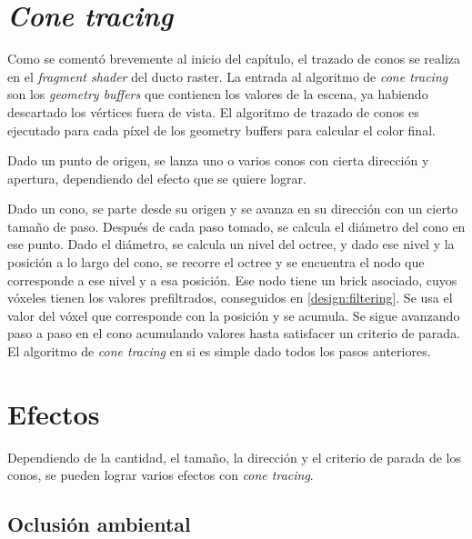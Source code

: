 
\section{\textit{Cone tracing}}\label{sec:cone_tracing}

Como se comentó brevemente al inicio del capítulo, el trazado de conos se realiza en el \textit{fragment shader} del ducto raster.
La entrada al algoritmo de \textit{cone tracing} son los \textit{geometry buffers} que contienen los valores de la escena, ya habiendo descartado los vértices fuera de vista.
El algoritmo de trazado de conos es ejecutado para cada píxel de los geometry buffers para calcular el color final.

Dado un punto de origen, se lanza uno o varios conos con cierta dirección y apertura, dependiendo del efecto que se quiere lograr.

Dado un cono, se parte desde su origen y se avanza en su dirección con un cierto tamaño de paso.
Después de cada paso tomado, se calcula el diámetro del cono en ese punto.
Dado el diámetro, se calcula un nivel del octree, y dado ese nivel y la posición a lo largo del cono, se recorre el octree y se encuentra el nodo que corresponde a ese nivel y a esa posición.
Ese nodo tiene un brick asociado, cuyos vóxeles tienen los valores prefiltrados, conseguidos en \ref{design:filtering}.
Se usa el valor del vóxel que corresponde con la posición y se acumula.
Se sigue avanzando paso a paso en el cono acumulando valores hasta satisfacer un criterio de parada.
El algoritmo de \textit{cone tracing} en si es simple dado todos los pasos anteriores.


\section{Efectos}

Dependiendo de la cantidad, el tamaño, la dirección y el criterio de parada de los conos, se pueden lograr varios efectos con \textit{cone tracing}.

\subsection{Oclusión ambiental}


